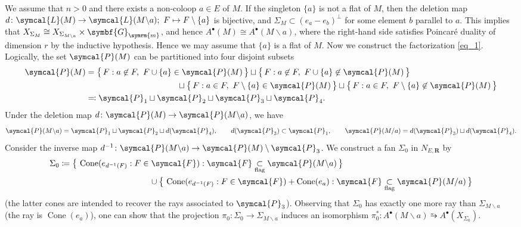 \documentclass[a4paper,final,oneside]{amsart}
\theoremstyle{definition}
\theoremstyle{plain}
\theoremstyle{remark}
\DeclareMathOperator{\Cone}{Cone}
\begin{document}
We assume that \(n>0\) and there exists a non-coloop \(a\in E\) of \(M\).
If the singleton \(\{a\}\) is not a flat of \(M\), then the deletion map \(d\colon \symcal{L}(M) \to \symcal{L}(M\backslash a);\ F \mapsto F\setminus\{a\}\) is bijective, and \(\Sigma_M \subset (e_a-e_b)^{\perp}\) for some element \(b\) parallel to \(a\).
This implies that  \(X_{\Sigma_M}\cong X_{\Sigma_{M\backslash a}}\times \symbf{G}_{\symrm{m}}\), and hence \(A^{\bullet}(M)\cong A^{\bullet}(M\backslash a)\), where the right-hand side satisfies Poincar\'e duality of dimension \(r\) by the inductive hypothesis.
Hence we may assume that \(\{a\}\) is a flat of \(M\).
Now we construct the factorization \eqref{eq_1}.
Logically, the set \(\symcal{P}(M)\) can be partitioned into four disjoint subsets
\begin{align}
\symcal{P}(M) &=\big\{\,F:a \not\in F,\ F \cup\{a\}\in\symcal{P}(M)\,\big\}\sqcup\big\{\,F: a\not\in F,\ F \cup \{a\} \not\in \symcal{P}(M)\,\big\}\\
&\hspace{11em}\sqcup\big\{\,F: a\in F,\ F \setminus\{a\} \in \symcal{P}(M)\,\big\}\sqcup\big\{\,F: a\in F,\ F \setminus \{a\} \not\in \symcal{P}(M)\,\big\}\\
&\eqcolon \symcal{P}_1\sqcup\symcal{P}_2\sqcup\symcal{P}_3\sqcup\symcal{P}_4.
\end{align}
Under the deletion map \(d\colon \symcal{P}(M)\to \symcal{P}(M\backslash a)\), we have
\[
\symcal{P}(M\backslash a)=\symcal{P}_1\sqcup \symcal{P}_2 \sqcup d(\symcal{P}_4),\qquad d(\symcal{P}_3)\subset \symcal{P}_1,\qquad \symcal{P}(M/a)=d(\symcal{P}_3)\sqcup d(\symcal{P}_4).
\]
Consider the inverse map \(d^{-1}\colon \symcal{P}(M\backslash a)\to \symcal{P}(M)\setminus \symcal{P}_3\).
We construct a fan \(\Sigma_0\) in \(N_{E,\symbf{R}}\) by
\begin{align}
&\Sigma_0\coloneq \big\{\,\Cone(e_{d^{-1}(F)}:F \in \symcal{F}): \symcal{F}\underset{\text{flag}}{\subset}\symcal{P}(M\backslash a)\,\big\}\\
&\hspace{12em}\cup \big\{\,\Cone(e_{d^{-1}(F)}:F \in \symcal{F})+\Cone (e_a):\symcal{F}\underset{\text{flag}}{\subset} \symcal{P}(M/a)\,\big\}
\end{align}
(the latter cones are intended to recover the rays associated to \(\symcal{P}_3\)).
Observing that \(\Sigma_0\) has exactly one more ray than \(\Sigma_{M\backslash a}\) \big(the ray is \(\Cone(e_a)\)\big), one can show that the projection \(\pi_0\colon\Sigma_0 \to \Sigma_{M\backslash a}\) induces an isomorphism \(\pi_0^*\colon A^{\bullet}(M\backslash a) \similarrightarrow A^{\bullet}(X_{\Sigma_0})\).
\end{document}
